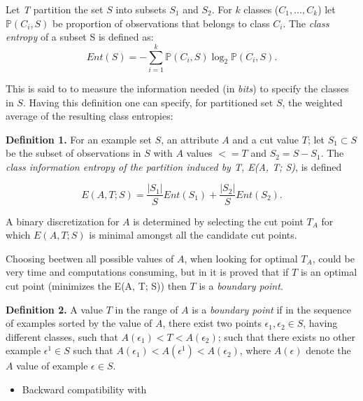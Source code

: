 \par 

Let \emph{T} partition the set \(S\) into subsets \(S_1\) and \(S_2\).
For \(k\) classes (\(C_1,\dots,C_k\)) let \(\mathbb{P}(C_i, S)\) be
proportion of observations that belongs to class \(C_i\). The
\emph{class entropy} of a subset S is defined as:
\[Ent(S) = - \sum_{i=1}^{k}\mathbb{P}(C_i, S)\log_{2}\mathbb{P}(C_i, S).\]

This is said to to measure the information needed (in \emph{bits}) to
specify the classes in \(S\). Having this definition one can specify,
for partitioned set \(S\), the weighted average of the resulting class
entropies:

\textbf{Definition 1.} For an example set \(S\), an attribute \(A\) and
a cut value \(T\); let \(S_1 \subset S\) be the subset of observations
in \(S\) with \(A\) values \(<= T\) and \(S_2 = S - S_1\). The
\emph{class information entropy of the partition induced by T, E(A, T;
S)}, is defined

\begin{equation}
E(A, T; S) = \frac{|S_1|}{S}Ent(S_1) + \frac{|S_2|}{S}Ent(S_2).
\end{equation}

A binary discretization for \(A\) is determined by selecting the cut
point \(T_A\) for which \(E(A, T; S)\) is minimal amongst all the
candidate cut points.

\par 

Choosing beetwen all possible values of \(A\), when looking for optimal
\(T_A\), could be very time and computations consuming, but in
\cite{Fayyad:1992:IDT:144532} it is proved that if \(T\) is an optimal
cut point (minimizes the E(A, T; S)) then \(T\) is a \emph{boundary
point}.

\textbf{Definition 2.} A value \(T\) in the range of \(A\) is a
\emph{boundary point} if in the sequence of examples sorted by the value
of \(A\), there exist two points \(\epsilon_1, \epsilon_2 \in S\),
having different classes, such that
\(A(\epsilon_1) < T < A(\epsilon_2)\); such that there exists no other
example \(\epsilon^1 \in S\) such that
\(A(\epsilon_1) < A(\epsilon^1) < A(\epsilon_2)\), where \(A(\epsilon)\)
denote the \(A\) value of example \(\epsilon \in S\).

\begin{itemize}
\tightlist
\item
  Backward compatibility with 
\end{itemize}

